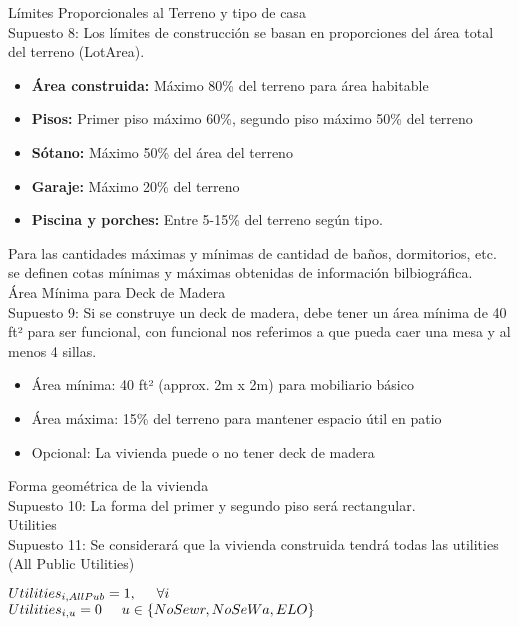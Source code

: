 {Límites Proporcionales al Terreno y tipo de casa}\\
{Supuesto 8:} Los límites de construcción se basan en proporciones del área total del terreno (LotArea).
\begin{itemize}
    \item \textbf{Área construida:} Máximo 80\% del terreno para área habitable
    \item \textbf{Pisos:} Primer piso máximo 60\%, segundo piso máximo 50\% del terreno
    \item \textbf{Sótano:} Máximo 50\% del área del terreno
    \item \textbf{Garaje:} Máximo 20\% del terreno
    \item \textbf{Piscina y porches:} Entre 5-15\% del terreno según tipo.
\end{itemize}

Para las cantidades máximas y mínimas de cantidad de baños, dormitorios, etc. se definen cotas mínimas y máximas obtenidas de información bilbiográfica.\\
{Área Mínima para Deck de Madera}\\
{Supuesto 9:} Si se construye un deck de madera, debe tener un área mínima de 40 ft² para ser funcional, con funcional nos referimos a que pueda caer una mesa y al menos 4 sillas.
\begin{itemize}
    \item Área mínima: 40 ft² (approx. 2m x 2m) para mobiliario básico
    \item Área máxima: 15\% del terreno para mantener espacio útil en patio
    \item Opcional: La vivienda puede o no tener deck de madera
\end{itemize}
{Forma geométrica de la vivienda}\\
{Supuesto 10:} La forma del primer y segundo piso será rectangular.\\
{Utilities}\\
{Supuesto 11:} Se considerará que la vivienda construida tendrá todas las utilities (All Public Utilities)
\begin{center}
    $Utilities_{i,AllPub}=1, \hspace{5mm} \forall i$\\
    $Utilities_{i,u}=0 \hspace{5mm} u \in\{NoSewr,NoSeWa,ELO\}$
\end{center}

